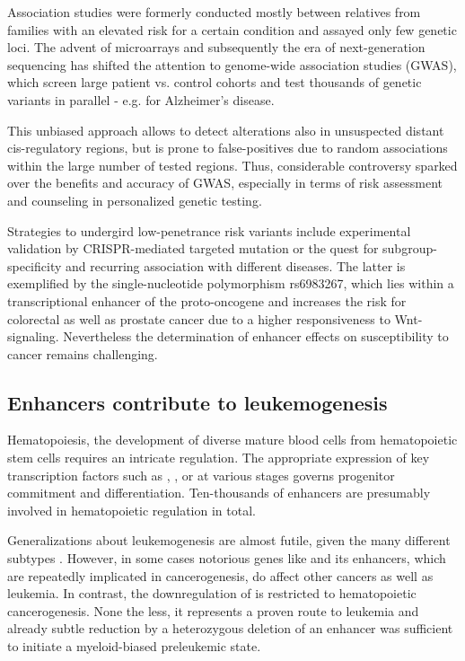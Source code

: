 Association studies were formerly conducted mostly between relatives from families with an elevated risk for a certain condition and assayed only few genetic loci. The advent of microarrays and subsequently the era of next-generation sequencing has shifted the attention to genome-wide association studies (GWAS), which screen large patient vs. control cohorts and test thousands of genetic variants in parallel - e.g. for Alzheimer's disease\cite{Kikuchi2019}.

This unbiased approach allows to detect alterations also in unsuspected distant cis-regulatory regions, but is prone to false-positives due to random associations within the large number of tested regions. Thus, considerable controversy sparked over the benefits and accuracy of GWAS, especially in terms of risk assessment and counseling in personalized genetic testing\cite{Heshka2008}. 

Strategies to undergird low-penetrance risk variants include experimental validation by CRISPR-mediated targeted mutation\cite{Fulco2016} or the quest for subgroup-specificity\cite{Lin2016} and recurring association with different diseases. The latter is exemplified by the single-nucleotide polymorphism rs6983267, which lies within a transcriptional enhancer of the  proto-oncogene and increases the risk for colorectal as well as prostate cancer\cite{Pomerantz2009,Wasserman2010} due to a higher responsiveness to Wnt-signaling\cite{Tuupanen2009}. Nevertheless the determination of enhancer effects on susceptibility to cancer remains challenging.

\subsection{Enhancers contribute to leukemogenesis}
\label{chap:i:enhancers:leukemia}

Hematopoiesis, the development of diverse mature blood cells from hematopoietic stem cells requires an intricate regulation. The appropriate expression of key transcription factors such as , ,  or \tfcebpa at various stages governs progenitor commitment and differentiation. Ten-thousands of enhancers are presumably involved in hematopoietic regulation in total\cite{Lara-Astiaso2014,Ulirsch2019,Bresnick2019}.

Generalizations about leukemogenesis are almost futile, given the many different subtypes . However, in some cases notorious genes like  and its enhancers, which are repeatedly implicated in cancerogenesis, do affect other cancers as well as leukemia\cite{Zuber2011,Shi2013}. In contrast, the downregulation of  is restricted to hematopoietic cancerogenesis. None the less, it represents a proven route to leukemia\cite{Rosenbauer2004,Metcalf2006} and already subtle  reduction by a heterozygous deletion of an enhancer was sufficient to initiate a myeloid-biased preleukemic state\cite{Will2015}.

